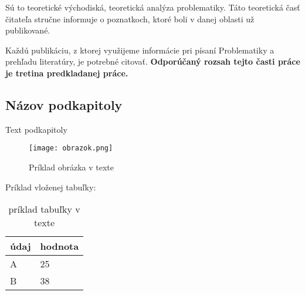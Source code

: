 \documentclass[../praca.tex]{subfiles}
\begin{document}
Sú to teoretické východiská, teoretická analýza problematiky. Táto teoretická
časť čitateľa stručne informuje o poznatkoch, ktoré boli v danej oblasti už
publikované.

Každú publikáciu, z ktorej využijeme informácie pri písaní Problematiky a
prehľadu literatúry, je potrebné citovať. \textbf{Odporúčaný rozsah tejto časti
    práce je tretina predkladanej práce.}

\subsection{Názov podkapitoly}

Text podkapitoly

\begin{figure}[ht]
    \centering
    \texttt{[image: obrazok.png]}
    \caption{Príklad obrázka v texte}
    \label{obr:priklad}
\end{figure}

Príklad vloženej tabuľky:

\begin{table}[ht]
    \centering
    \caption{príklad tabuľky v texte}
    \label{tab:priklad}

    \vspace{6pt}

    \begin{tabularx}{0.8\textwidth}{|X|X|}
        \hline
        údaj & hodnota \\ \hline
        A    & 25      \\ \hline
        B    & 38      \\ \hline
    \end{tabularx}
\end{table}
\end{document}
